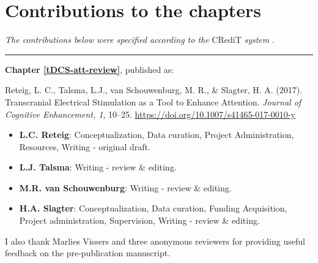 \documentclass[11pt,]{memoir}
\providecommand{\tightlist}{%
  \setlength{\itemsep}{0pt}\setlength{\parskip}{0pt}}
\let\rmarkdownfootnote\footnote%
\def\footnote{\protect\rmarkdownfootnote}
\let\oldhref\href %
\renewcommand{\href}[2]{#2\footnote{\url{#1}}} %
\renewcommand{\arraystretch}{1.5} %
\begin{document}
\renewcommand{\arraystretch}{1.5}
\normalsize

\backmatter
{}
\cleardoublepage
{} 
\let\href\oldhref

\hypertarget{refs}{}

\printbibliography
\renewcommand{\printbibliography}{}

\hypertarget{contributions-to-the-chapters}{%
\chapter*{Contributions to the chapters}\label{contributions-to-the-chapters}}


\setlength{\parindent}{0pt}
\small

\emph{The contributions below were specified according to the} CRediT \emph{system} \autocite[Contributor Roles Taxonomy; \url{https://www.casrai.org/credit.html};][]{Brand2015}.

\begin{center}\rule{0.5\linewidth}{\linethickness}\end{center}

\textbf{Chapter \ref{tDCS-att-review}}, published as:

Reteig, L. C., Talsma, L.J., van Schouwenburg, M. R., \& Slagter, H. A. (2017). Transcranial Electrical
Stimulation as a Tool to Enhance Attention. \emph{Journal of Cognitive Enhancement, 1}, 10--25. \url{https://doi.org/10.1007/s41465-017-0010-y}

\begin{itemize}
\tightlist
\item
  \textbf{L.C. Reteig}: Conceptualization, Data curation, Project Administration, Resources, Writing - original draft.
\item
  \textbf{L.J. Talsma}: Writing - review \& editing.
\item
  \textbf{M.R. van Schouwenburg}: Writing - review \& editing.
\item
  \textbf{H.A. Slagter}: Conceptualization, Data curation, Funding Acquisition, Project administration, Supervision, Writing - review \& editing.
\end{itemize}

\begin{list}{}{\leftmargin=1.5em\rightmargin=0pt}
\item
I also thank Marlies Vissers and three anonymous reviewers for providing useful feedback on the pre-publication manuscript.
\end{list}
\end{document}
